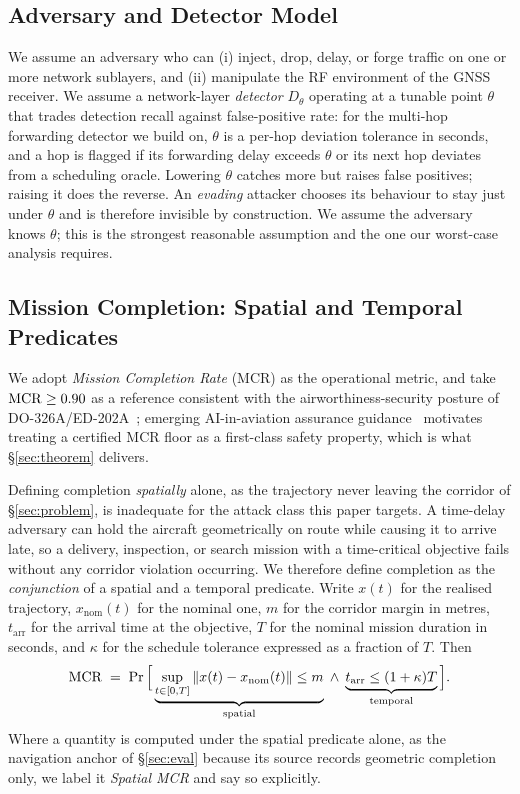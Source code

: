 \subsection{Adversary and Detector Model}
\label{sec:adversary}
We assume an adversary who can (i) inject, drop, delay, or forge traffic on one
or more network sublayers, and (ii) manipulate the RF environment of the GNSS
receiver. We assume a network-layer \emph{detector} $D_\theta$ operating at a
tunable point $\theta$ that trades detection recall against false-positive rate:
for the multi-hop forwarding detector we build on, $\theta$ is a per-hop
deviation tolerance in seconds, and a hop is flagged if its forwarding delay
exceeds $\theta$ or its next hop deviates from a scheduling oracle. Lowering
$\theta$ catches more but raises false positives; raising it does the reverse.
An \emph{evading} attacker chooses its behaviour to stay just under $\theta$ and
is therefore invisible by construction. We assume the adversary knows $\theta$;
this is the strongest reasonable assumption and the one our worst-case analysis
requires.

\subsection{Mission Completion: Spatial and Temporal Predicates}
\label{sec:mcr}
We adopt \emph{Mission Completion Rate} (MCR) as the operational metric, and
take $\mathrm{MCR}\ge0.90$ as a reference consistent with the airworthiness-security
posture of DO-326A/ED-202A~\cite{do326a}; emerging AI-in-aviation assurance
guidance~\cite{ed324} motivates treating a certified MCR floor as a first-class
safety property, which is what \S\ref{sec:theorem} delivers.

Defining completion \emph{spatially} alone, as the trajectory never leaving the
corridor of \S\ref{sec:problem}, is inadequate for the attack class this paper
targets. A time-delay adversary can hold the aircraft geometrically on route
while causing it to arrive late, so a delivery, inspection, or search mission
with a time-critical objective fails without any corridor violation occurring.
We therefore define completion as the \emph{conjunction} of a spatial and a
temporal predicate. Write $x(t)$ for the realised trajectory,
$x_{\mathrm{nom}}(t)$ for the nominal one, $m$ for the corridor margin in
metres, $t_{\mathrm{arr}}$ for the arrival time at the objective, $T$ for the
nominal mission duration in seconds, and $\kappa$ for the schedule tolerance
expressed as a fraction of $T$. Then
\begin{equation}
\label{eq:mcr}
\mathrm{MCR} \;=\; \Pr\Big[\underbrace{\sup_{t\in[0,T]}\left\lVert x(t)-x_{\mathrm{nom}}(t)\right\rVert\le m}_{\text{spatial}}
\;\wedge\;
\underbrace{t_{\mathrm{arr}}\le(1+\kappa)T}_{\text{temporal}}\Big].
\end{equation}
Where a quantity is computed under the spatial predicate alone, as the
navigation anchor of \S\ref{sec:eval} because its source records geometric
completion only, we label it \emph{Spatial MCR} and say so explicitly.

